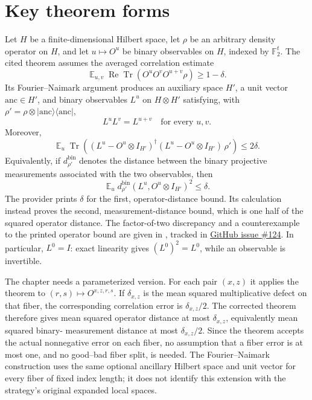 \documentclass[11pt]{article}
\renewcommand{\ghissue}[1]{%
  \href{https://github.com/Dengnifer/MIPStarRE-QPBT/issues/#1}{GitHub issue \##1}}
\begin{document}
\section{Key theorem forms}

Let $H$ be a finite-dimensional Hilbert space, let $\rho$ be an arbitrary
density operator on $H$, and let $u\mapsto O^u$ be binary observables on $H$,
indexed by $\mathbb F_2^t$.  The cited theorem assumes the averaged
correlation estimate
\[
  \mathop{\mathbb E}_{u,v}
  \operatorname{Re}\operatorname{Tr}\!\left(
    O^u O^v O^{u+v}\rho\right) \geq 1-\delta.
\]
Its Fourier--Naimark argument produces an auxiliary space $H'$, a unit vector
$\mathrm{anc}\in H'$, and binary observables $L^u$ on $H\otimes H'$ satisfying,
with
$\rho'=\rho\otimes|\mathrm{anc}\rangle\langle\mathrm{anc}|$,
\[
  L^uL^v=L^{u+v}
  \quad\text{for every }u,v.
\]
Moreover,
\[
  \mathop{\mathbb E}_{u}
  \operatorname{Tr}\!\left((L^u-O^u\otimes I_{H'})^\dagger
    (L^u-O^u\otimes I_{H'})\,\rho'\right)\leq2\delta.
\]
Equivalently, if $d^{\mathrm{bin}}_{\rho'}$ denotes the distance between the
binary projective measurements associated with the two observables, then
\[
  \mathop{\mathbb E}_{u}
  d^{\mathrm{bin}}_{\rho'}(L^u,O^u\otimes I_{H'})^2\leq\delta.
\]
The provider prints $\delta$ for the first, operator-distance bound.  Its
calculation instead proves the second, measurement-distance bound, which is
one half of the squared operator distance.  The factor-of-two discrepancy and
a counterexample to the printed operator bound are given in
, tracked in
\ghissue{124}.
In particular, $L^0=I$: exact linearity gives $(L^0)^2=L^0$, while an
observable is invertible.

The chapter needs a parameterized version.  For each pair $(x,z)$ it applies
the theorem to $(r,s)\mapsto O^{x,z,r,s}$.  If $\delta_{x,z}$ is the mean
squared multiplicative defect on that fiber, the corresponding correlation
error is $\delta_{x,z}/2$.  The corrected theorem therefore gives mean squared
operator distance at most $\delta_{x,z}$, equivalently mean squared binary-
measurement distance at most $\delta_{x,z}/2$.  Since the theorem accepts the
actual nonnegative error on each fiber, no assumption that a fiber error is at
most one, and no good--bad fiber split, is needed. The Fourier--Naimark
construction uses the same optional ancillary Hilbert space and unit vector
for every fiber of fixed index length; it does not identify this extension
with the strategy's original expanded local spaces.
\end{document}
